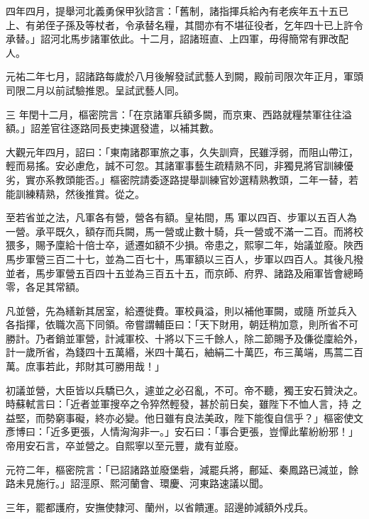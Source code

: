 \begin{pinyinscope}
 四年四月，提舉河北義勇保甲狄諮言：「舊制，諸指揮兵給內有老疾年五十五已上、有弟侄子孫及等杖者，令承替名糧，其間亦有不堪征役者，乞年四十已上許令承替。」詔河北馬步諸軍依此。十二月，詔諸班直、上四軍，毋得簡常有罪改配人。



 元祐二年七月，詔諸路每歲於八月後解發試武藝人到闕，殿前司限次年正月，軍頭司限二月以前試驗推恩。呈試武藝人同。



 三
 年閏十二月，樞密院言：「在京諸軍兵額多闕，而京東、西路就糧禁軍往往溢額。」詔差官往逐路同長吏揀選發遣，以補其數。



 大觀元年四月，詔曰：「東南諸郡軍旅之事，久失訓齊，民雖浮弱，而阻山帶江，輕而易搖。安必慮危，誠不可忽。其諸軍事藝生疏精熟不同，非獨見將官訓練優劣，實亦系教頭能否。」樞密院請委逐路提舉訓練官妙選精熟教頭，二年一替，若能訓練精熟，然後推賞。從之。



 至若省並之法，凡軍各有營，營各有額。皇祐間，馬
 軍以四百、步軍以五百人為一營。承平既久，額存而兵闕，馬一營或止數十騎，兵一營或不滿一二百。而將校猥多，賜予廩給十倍士卒，遞遷如額不少損。帝患之，熙寧二年，始議並廢。陜西馬步軍營三百二十七，並為二百七十，馬軍額以三百人，步軍以四百人。其後凡撥並者，馬步軍營五百四十五並為三百五十五，而京師、府界、諸路及廂軍皆會總畸零，各足其常額。



 凡並營，先為繕新其居室，給遷徙費。軍校員溢，則以補他軍闕，或隨
 所並兵入各指揮，依職次高下同領。帝嘗謂輔臣曰：「天下財用，朝廷稍加意，則所省不可勝計。乃者銷並軍營，計減軍校、十將以下三千餘人，除二節賜予及傔從廩給外，計一歲所省，為錢四十五萬緡，米四十萬石，紬絹二十萬匹，布三萬端，馬蒿二百萬。庶事若此，邦財其可勝用哉！」



 初議並營，大臣皆以兵驕已久，遽並之必召亂，不可。帝不聽，獨王安石贊決之。時蘇軾言曰：「近者並軍搜卒之令猝然輕發，甚於前日矣，雖陛下不恤人言，持
 之益堅，而勢窮事礙，終亦必變。他日雖有良法美政，陛下能復自信乎？」樞密使文彥博曰：「近多更張，人情洶洶非一。」安石曰：「事合更張，豈憚此輩紛紛邪！」帝用安石言，卒並營之。自熙寧以至元豐，歲有並廢。



 元符二年，樞密院言：「已詔諸路並廢堡砦，減罷兵將，鄜延、秦鳳路已減並，餘路未見施行。」詔涇原、熙河蘭會、環慶、河東路速議以聞。



 三年，罷都護府，安撫使隸河、蘭州，以省饋運。詔邊帥減額外戍兵。




\end{pinyinscope}
